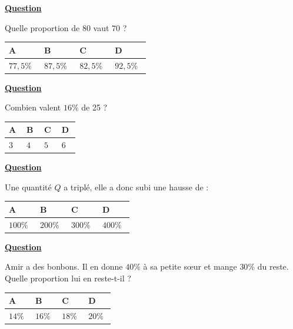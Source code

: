 \documentclass[oneside,12pt]{article}
\begin{document}
\underline{\textbf{Question }}

Quelle proportion de $80$ vaut $70$ ?

\begin{center}
	\renewcommand{\arraystretch}{1.35}
	\begin{tabular}{| P{0.22\linewidth} | P{0.22\linewidth} | P{0.22\linewidth} | P{0.22\linewidth} |} \hline
	A & B & C & D \\ \hline
	$77,5\%$ & $87,5\%$ & $82,5\%$ & $92,5\%$ \\\hline
	\end{tabular}
\end{center}



\underline{\textbf{Question }}

Combien valent $16\%$ de 25 ? 

\begin{center}
	\renewcommand{\arraystretch}{1.35}
	\begin{tabular}{| P{0.22\linewidth} | P{0.22\linewidth} | P{0.22\linewidth} | P{0.22\linewidth} |} \hline
	A & B & C & D \\ \hline
	$3$ & $4$ & $5$ & $6$ \\\hline
	\end{tabular}
\end{center}



\underline{\textbf{Question }}

Une quantité $Q$ a triplé, elle a donc subi une hausse de :

\begin{center}
	\renewcommand{\arraystretch}{1.35}
	\begin{tabular}{| P{0.22\linewidth} | P{0.22\linewidth} | P{0.22\linewidth} | P{0.22\linewidth} |} \hline
	A & B & C & D \\ \hline
	$100\%$ & $200\%$ & $300\%$ & $400\%$ \\\hline
	\end{tabular}
\end{center}



\underline{\textbf{Question }}

Amir a des bonbons. Il en donne $40\%$ à sa petite sœur et mange $30\%$ du reste. Quelle proportion lui en reste-t-il ?

\begin{center}
	\renewcommand{\arraystretch}{1.35}
	\begin{tabular}{| P{0.22\linewidth} | P{0.22\linewidth} | P{0.22\linewidth} | P{0.22\linewidth} |} \hline
	A & B & C & D \\ \hline
	\rule{0pt}{5mm}
	$14\%$ & $16\%$ & $18\%$ & $20\%$ \\ \hline
	\end{tabular}
\end{center}
\end{document}
